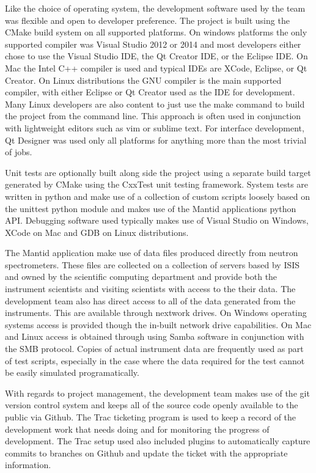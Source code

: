 \documentclass[paper=a4, fontsize=11pt]{scrartcl}	%
\numberwithin{equation}{section}															%
\numberwithin{figure}{section}																%
\numberwithin{table}{section}
\begin{document}
Like the choice of operating system, the development software used by
the team was flexible and open to developer preference. The project is
built using the CMake build system on all supported platforms. On
windows platforms the only supported compiler was Visual Studio 2012 or
2014 and most developers either chose to use the Visual Studio IDE, the
Qt Creator IDE, or the Eclipse IDE. On Mac the Intel C++ compiler is
used and typical IDEs are XCode, Eclipse, or Qt Creator. On Linux
distributions the GNU compiler is the main supported compiler, with
either Eclipse or Qt Creator used as the IDE for development. Many Linux
developers are also content to just use the make command to build the
project from the command line. This approach is often used in
conjunction with lightweight editors such as vim or sublime text. For
interface development, Qt Designer was used only all platforms for
anything more than the most trivial of jobs.

Unit tests are optionally built along side the project using a separate
build target generated by CMake using the CxxTest unit testing
framework. System tests are written in python and make use of a
collection of custom scripts loosely based on the unittest python module
and makes use of the Mantid applications python API. Debugging software
used typically makes use of Visual Studio on Windows, XCode on Mac and
GDB on Linux distributions.

The Mantid application make use of data files produced directly from
neutron spectrometers. These files are collected on a collection of
servers based by ISIS and owned by the scientific computing department
and provide both the instrument scientists and visiting scientists with
access to the their data. The development team also has direct access to
all of the data generated from the instruments. This are available
through nextwork drives. On Windows operating systems access is provided
though the in-built network drive capabilities. On Mac and Linux access
is obtained through using Samba software in conjunction with the SMB
protocol. Copies of actual instrument data are frequently used as part
of test scripts, especially in the case where the data required for the
test cannot be easily simulated programatically.

With regards to project management, the development team makes use of
the git version control system and keeps all of the source code openly
available to the public via Github. The Trac ticketing program is used
to keep a record of the development work that needs doing and for
monitoring the progress of development. The Trac setup used also
included plugins to automatically capture commits to branches on Github
and update the ticket with the appropriate information.
\end{document}
